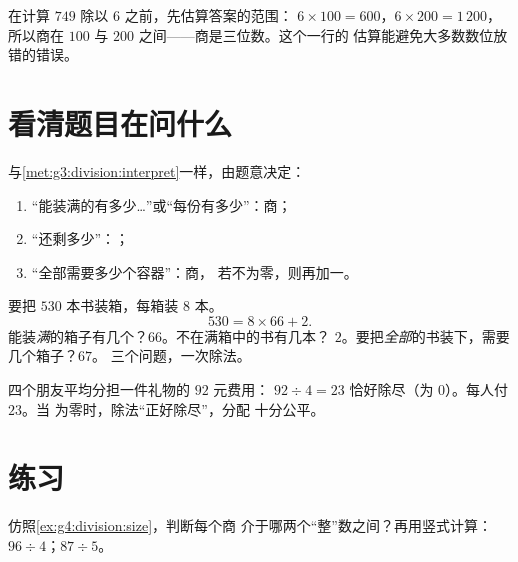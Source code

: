 \begin{example}[估算商的大小]\label{ex:g4:division:size}
在计算 $749$ 除以 $6$ 之前，先估算答案的范围：
$6 \times 100 = 600$，$6 \times 200 = 1\,200$，所以商在
$100$ 与 $200$ 之间——商是三位数。这个一行的
估算能避免大多数数位放错的错误。
\end{example}

\section{看清题目在问什么}

\begin{method}[商、余数，还是商加一]\label{met:g4:division:interpret}
与\cref{met:g3:division:interpret}一样，由题意决定：
\begin{enumerate}
  \item “能装满的有多少\dots”或“每份有多少”：商；
  \item “还剩多少”：；
  \item “全部需要多少个容器”：商，
        若不为零，则再加一。
\end{enumerate}
\end{method}

\begin{example}\label{ex:g4:division:problem}
要把 $530$ 本书装箱，每箱装 $8$ 本。
\[
530 = 8 \times 66 + 2 .
\]
能装\emph{满}的箱子有几个？$66$。不在满箱中的书有几本？
$2$。要把\emph{全部}的书装下，需要几个箱子？$67$。
三个问题，一次除法。
\end{example}

\begin{example}[公平分钱]\label{ex:g4:division:money}
四个朋友平均分担一件礼物的 $92$ 元费用：
$92 \div 4 = 23$ 恰好除尽（为 $0$）。每人付 $23$。当
为零时，除法“正好除尽”，分配
十分公平。
\end{example}

\section{练习}

\begin{exercise}[$\star$]\label{exo:g4:division:1}
仿照\cref{ex:g4:division:size}，判断每个商
介于哪两个“整”数之间？再用竖式计算：
$96 \div 4$；\quad $87 \div 5$。
\end{exercise}

